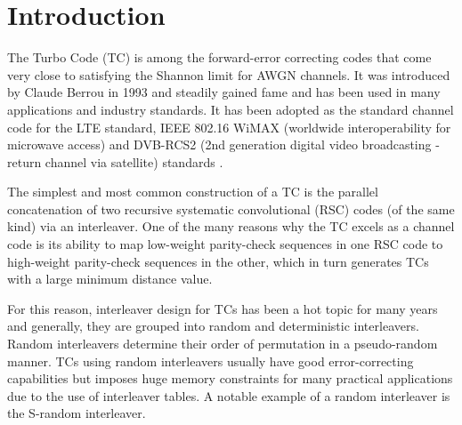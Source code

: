 \section{Introduction}

The Turbo Code (TC) \cite{ref1} is among the forward-error correcting codes that come very close to satisfying the Shannon limit for AWGN channels. It was introduced by Claude Berrou in 1993 and steadily gained fame and has been used in many applications and industry standards. It has been adopted as the standard channel code for the LTE standard, IEEE 802.16 WiMAX (worldwide interoperability for microwave access) and DVB-RCS2 (2nd generation digital video broadcasting - return channel via satellite) standards \cite{ref7}.

 The simplest and most common construction of a TC is the parallel concatenation of two recursive systematic convolutional (RSC) codes (of the same kind) via an interleaver. One of the many reasons why the TC excels as a channel code is its ability to map low-weight parity-check sequences in one RSC code to high-weight parity-check sequences in the other, which in turn generates TCs with a large minimum distance value.

 For this reason, interleaver design for TCs has been a hot topic for many years and generally, they are grouped into random and deterministic interleavers. Random interleavers determine their order of permutation in a pseudo-random manner. TCs using random interleavers usually have good error-correcting capabilities but imposes huge memory constraints for many practical applications due to the use of interleaver tables. A notable example of a random interleaver is the S-random interleaver.

